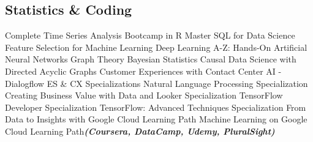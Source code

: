 \documentclass[letterpaper]{deedy-resume_sm} %
\begin{document}
\subsection{Statistics \& Coding}
Complete Time Series Analysis Bootcamp in R \textbullet{} Master SQL for Data Science \textbullet{} Feature Selection for Machine Learning \textbullet{} Deep Learning A-Z: Hands-On Artificial Neural Networks \textbullet{} Graph Theory \textbullet{} Bayesian Statistics \textbullet{} Causal Data Science with Directed Acyclic Graphs \textbullet{} Customer Experiences with Contact Center AI - Dialogflow ES \& CX Specializations \textbullet{} Natural Language Processing Specialization \textbullet{} Creating Business Value with Data and Looker Specialization \textbullet{} TensorFlow Developer Specialization \textbullet{} TensorFlow: Advanced Techniques Specialization \textbullet{} From Data to Insights with Google Cloud Learning Path \textbullet{} Machine Learning on Google Cloud Learning Path{\footnotesize \textit{\textbf{(Coursera, DataCamp, Udemy, PluralSight)}}}
\end{document}
